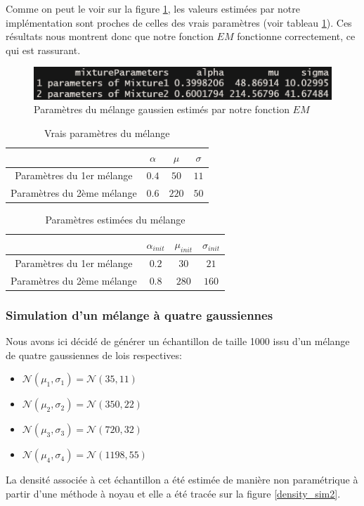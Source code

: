 \documentclass[a4paper,french,10pt]{article}
\begin{document}
 Comme on peut le voir sur la figure \ref{res_sim}, les valeurs estimées par notre implémentation sont proches de celles des vrais paramètres (voir tableau \ref{tab1}). Ces résultats nous montrent donc que notre fonction $EM$ fonctionne correctement, ce qui est rassurant.
 
 \begin{figure}[htp] 
 	\centering
 	\includegraphics[scale=0.7]{images/res_sim.png}
 	\caption{Paramètres du mélange gaussien estimés par notre fonction $EM$}
 	\label{res_sim}
 \end{figure}

\begin{table}[htp]
	\center
	\begin{tabular}{|c||c|c|c|}
		\hline
		& $\alpha$ & $\mu$ & $\sigma$\\
		\hline
		Paramètres du 1er mélange & $0.4$ & $50$ & $11$ \\
		\hline
		Paramètres du 2ème mélange & $0.6$ & $220$ & $50$ \\
		\hline
	\end{tabular}
	\caption{Vrais paramètres du mélange}
	\label{tab1}
\end{table}

\newpage

\begin{table}[htp]
	\center
	\begin{tabular}{|c||c|c|c|}
		\hline
		& $\alpha_{init}$ & $\mu_{init}$ & $\sigma_{init}$\\
		\hline
		Paramètres du 1er mélange & $0.2$ & $30$ & $21$ \\
		\hline
		Paramètres du 2ème mélange & $0.8$ & $280$ & $160$ \\
		\hline
	\end{tabular}
	\caption{Paramètres estimées du mélange}
	\label{tab2}
\end{table}

\subsubsection{Simulation d'un mélange à quatre gaussiennes}
Nous avons ici décidé de générer un échantillon de taille 1000 issu d'un mélange de quatre gaussiennes de lois respectives:
\begin{itemize}
	\item $\mathcal{N}(\mu_1, \sigma_1) = \mathcal{N}(35, 11)$
	\item $\mathcal{N}(\mu_2, \sigma_2) = \mathcal{N}(350, 22)$
	\item $\mathcal{N}(\mu_3, \sigma_3) = \mathcal{N}(720, 32)$
	\item $\mathcal{N}(\mu_4, \sigma_4) = \mathcal{N}(1198, 55)$
\end{itemize}
La densité associée à cet échantillon a été estimée de manière non paramétrique à partir d'une méthode à noyau et elle a été tracée sur la figure \ref{density_sim2}.
\end{document}
